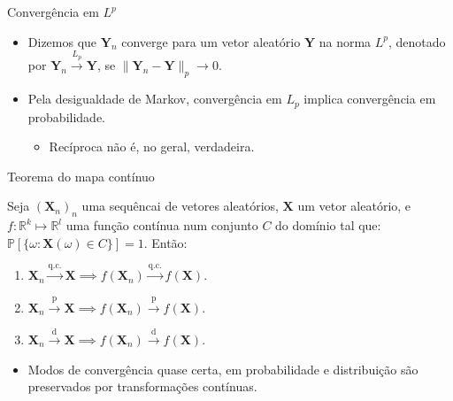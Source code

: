 \documentclass[11pt]{beamer}
\begin{document}
	\begin{frame}{Convergência em $L^p$}
		\begin{itemize}
			\item 		Dizemos que $\boldsymbol{Y}_n$ converge para um vetor aleatório $\boldsymbol{Y}$ na norma $L^p$, denotado por $\boldsymbol{Y}_n \overset{{L}_p}{\to} \boldsymbol{Y}$, se $\lVert  \boldsymbol{Y}_n -\boldsymbol{Y}\rVert_p \to 0$.
			\item Pela desigualdade de Markov, convergência em $L_p$ implica convergência em probabilidade.
			\begin{itemize}
				\item Recíproca não é, no geral, verdadeira.
			\end{itemize} 
		\end{itemize}

	\end{frame}
	
	\begin{frame}{Teorema do mapa contínuo}
	\begin{theorem}
		Seja $(\boldsymbol{X}_n)_n$ uma sequêncai de vetores aleatórios, $\boldsymbol{X}$ um vetor aleatório, e $f:\mathbb{R}^k \mapsto \mathbb{R}^l$ uma função contínua num conjunto $C$ do domínio tal que:
		$\mathbb{P}[\{\omega:\boldsymbol{X}(\omega)\in C\}]=1$. Então:
		
		\begin{enumerate}
			\item $\boldsymbol{X}_n \overset{\text{q.c.}}{\to} \boldsymbol{X} \implies f(\boldsymbol{X}_n) \overset{\text{q.c.}}{\to} f(\boldsymbol{X} ) $.
			\item  $\boldsymbol{X}_n \overset{\text{p}}{\to} \boldsymbol{X} \implies f(\boldsymbol{X}_n) \overset{\text{p}}{\to} f(\boldsymbol{X} ) $.
			 \item $\boldsymbol{X}_n \overset{\text{d}}{\to} \boldsymbol{X} \implies f(\boldsymbol{X}_n) \overset{\text{d}}{\to} f(\boldsymbol{X} ) $.
		\end{enumerate}
	\end{theorem}
	\begin{itemize}
		\item Modos de convergência quase certa, em probabilidade e distribuição são preservados por transformações contínuas.
	\end{itemize}
	\end{frame}
	
\end{document}
